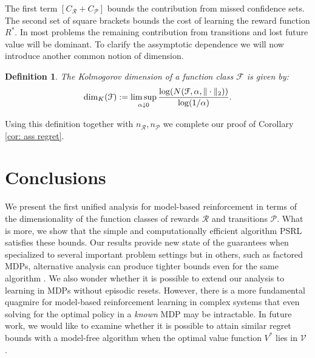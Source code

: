 \documentclass{article}
\newtheorem{mydef}{Definition}
\newcommand{\Pc}{\mathcal{P}}
\newcommand{\Fc}{\mathcal{F}}
\newcommand{\Rc}{\mathcal{R}}
\begin{document}
The first term $[C_\Rc + C_\Pc]$ bounds the contribution from missed confidence sets.
The second set of square brackets bounds the cost of learning the reward function $R^*$.
In most problems the remaining contribution from transitions and lost future value will be dominant.
To clarify the assymptotic dependence we will now introduce another common notion of dimension.
\begin{mydef}
\label{def: kol}
The Kolmogorov dimension of a function class $\Fc$ is given by:
$$ {\rm dim}_K(\Fc) := \limsup_{\alpha \downarrow 0} \frac{\log(N(\Fc,\alpha,\|\cdot\|_2))}{\log(1/\alpha)} .$$
\end{mydef}
Using this definition together with $n_\Rc,n_\Pc$ we complete our proof of Corollary \ref{cor: ass regret}.


\section{Conclusions}
We present the first unified analysis for model-based reinforcement in terms of the dimensionality of the function classes of rewards $\Rc$ and transitions $\Pc$.
What is more, we show that the simple and computationally efficient algorithm PSRL satisfies these bounds.
Our results provide new state of the guarantees when specialized to several important problem settings but in others, such as factored MDPs, alternative analysis can produce tighter bounds even for the same algorithm \cite{osband2014near}.
We also wonder whether it is possible to extend our analysis to learning in MDPs without episodic resets.
However, there is a more fundamental quagmire for model-based reinforcement learning in complex systems that even solving for the optimal policy in a \emph{known} MDP may be intractable.
In future work, we would like to examine whether it is possible to attain similar regret bounds with a model-free algorithm when the optimal value function $V^*$ lies in $\mathcal{V}$ \cite{van2014generalization}.



\newpage
\small{


}
\newpage
\end{document}
